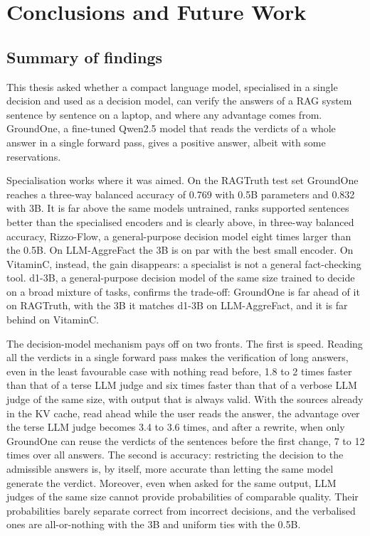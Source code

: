 \chapter{Conclusions and Future Work}
\label{sec:conclusion}

\section{Summary of findings}
\label{sec:concl-summary}

This thesis asked whether a compact language model, specialised in a single decision and used as a decision model, can
verify the answers of a RAG system sentence by sentence on a laptop, and where any advantage comes from. GroundOne, a
fine-tuned Qwen2.5 model that reads the verdicts of a whole answer in a single forward pass, gives a positive answer,
albeit with some reservations.

Specialisation works where it was aimed. On the RAGTruth test set GroundOne reaches a three-way balanced accuracy of
0.769 with 0.5B parameters and 0.832 with 3B. It is far above the same models untrained, ranks supported sentences better
than the specialised encoders and is clearly above, in three-way balanced accuracy, Rizzo-Flow, a general-purpose
decision model eight times larger than the 0.5B. On LLM-AggreFact the 3B is on par with the best small encoder. On
VitaminC, instead, the gain disappears: a specialist is not a general fact-checking tool. d1-3B, a general-purpose
decision model of the same size trained to decide on a broad mixture of tasks, confirms the trade-off: GroundOne is far
ahead of it on RAGTruth, with the 3B it matches d1-3B on LLM-AggreFact, and it is far behind on VitaminC.

The decision-model mechanism pays off on two fronts. The first is speed. Reading all the verdicts in a single forward
pass makes the verification of long answers, even in the least favourable case with nothing read before, 1.8 to 2 times faster than that of a terse LLM judge and six times faster than that of a verbose LLM judge of the same size, with output that is always valid. With the sources already in the KV cache, read ahead while the user reads the answer, the advantage over the terse LLM judge becomes 3.4 to 3.6 times, and after a rewrite, when only GroundOne can reuse the verdicts of the sentences before the first change, 7 to 12 times over all answers. The second is accuracy:
restricting the decision to the admissible answers is, by itself, more accurate than letting the same model generate the
verdict. Moreover, even when asked for the same output, LLM judges of the same size cannot provide probabilities of comparable quality. Their probabilities barely separate correct from incorrect decisions, and the verbalised ones are all-or-nothing with the 3B and uniform ties with the 0.5B.

